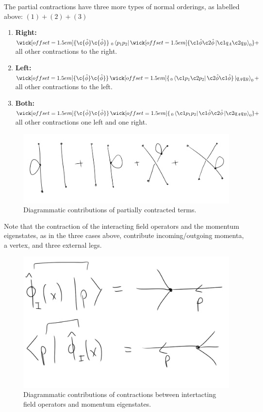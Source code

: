 \noindent The partial contractions have three more types of normal orderings, as labelled above: $(1) + (2) + (3)$
\begin{enumerate}
\item \textbf{Right:} $\wick[offset=1.5em]{\c {\hat{\phi}} \c {\hat{\phi}}} \,\,_0\bra{p_1 p_2} \wick[offset=1.5em]{\c1 {\hat{\phi}} \c2 {\hat{\phi}} \ket{ \c1 {q_A} \c2{q_B} }_0 } + $ all other contractions to the right.
\item \textbf{Left:} $\wick[offset=1.5em]{\c {\hat{\phi}} \c {\hat{\phi}}} \, \wick[offset=1.5em]{ \,_0\bra{ \c1 {p_1} \c2 {p_2} } \c2 {\hat{\phi}} \c1 {\hat{\phi}}} \ket{q_A q_B}_0  + $ all other contractions to the left.
\item \textbf{Both:} $\wick[offset=1.5em]{\c {\hat{\phi}} \c {\hat{\phi}}} \, \wick[offset=1.5em]{ \,_0\bra{ \c1 {p_1} p_2} \c1 {\hat{\phi}} \c2 {\hat{\phi}} \ket{ \c2 {q_A} q_B }_0 } + $ all other contractions one left and one right.
\end{enumerate}

\begin{figure}[H]
	\centering
	\includegraphics[scale=0.4]{images/partcont.png}
	\caption{Diagrammatic contributions of partially contracted terms.}
\end{figure}

\noindent Note that the contraction of the interacting field operators and the momentum eigenstates, as in the three cases above, contribute incoming/outgoing momenta, a vertex, and three external legs.

\begin{figure}[H]
	\centering
	\includegraphics[scale=0.3]{images/opstatecont.png}
	\caption{Diagrammatic contributions of contractions between intertacting field operators and momentum eigenstates.}
\end{figure}

